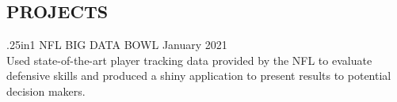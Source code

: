 \documentclass[11pt]{res} %
\begin{document}
\begin{resume}
\vspace{-0.2in}
\hrulefill
\vspace{-0.2in}  

\section{PROJECTS}
\begin{hangparas}{.25in}{1}
NFL BIG DATA BOWL \hfill January 2021 \\
Used state-of-the-art player tracking data provided by the NFL to evaluate defensive skills and produced a shiny application to present results to potential decision makers.
	\vspace{-0.15in}  
	


\end{hangparas}
\end{resume}
\end{document}
